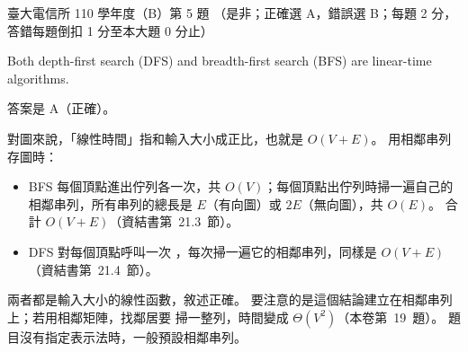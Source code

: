 \begin{pastexam}[label={px:ntu-110-comm-dsa-05}]{臺大電信所 110 學年度（B）第 5 題}
（是非；正確選 A，錯誤選 B；每題 2 分，答錯每題倒扣 1 分至本大題 0 分止）

Both depth-first search (DFS) and breadth-first search (BFS) are linear-time algorithms.
\end{pastexam}

\begin{pastsoln}
答案是 A（正確）。

對圖來說，「線性時間」指和輸入大小成正比，也就是 $O(V + E)$。 用相鄰串列存圖時：
\begin{itemize}
\item BFS 每個頂點進出佇列各一次，共 $O(V)$；每個頂點出佇列時掃一遍自己的相鄰串列，所有串列的總長是
$E$（有向圖）或 $2E$（無向圖），共 $O(E)$。 合計 $O(V + E)$（資結書第~21.3~節）。
\item DFS 對每個頂點呼叫一次 ，每次掃一遍它的相鄰串列，同樣是 $O(V + E)$
（資結書第~21.4~節）。
\end{itemize}
兩者都是輸入大小的線性函數，敘述正確。 要注意的是這個結論建立在相鄰串列上；若用相鄰矩陣，找鄰居要
掃一整列，時間變成 $\Theta(V^2)$（本卷第~19~題）。 題目沒有指定表示法時，一般預設相鄰串列。
\end{pastsoln}
